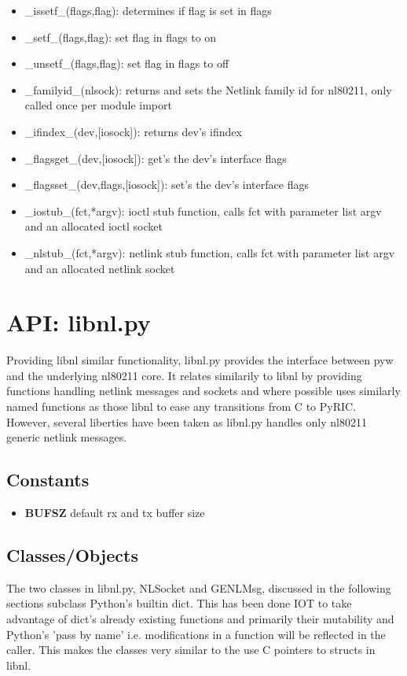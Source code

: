\documentclass[11pt]{article}
\begin{document}
\begin{appendices}
\begin{itemize}
\begin{itemize}
\item \_issetf\_(flags,flag): determines if flag is set in flags
\item \_setf\_(flags,flag): set flag in flags to on
\item \_unsetf\_(flags,flag): set flag in flags to off
\item \_familyid\_(nlsock): returns and sets the Netlink family id for nl80211, 
only called once per module import
\item \_ifindex\_(dev,[iosock]): returns dev's ifindex
\item \_flagsget\_(dev,[iosock]): get's the dev's interface flags
\item \_flagsset\_(dev,flags,[iosock]): set's the dev's interface flags
\item \_iostub\_(fct,*argv): ioctl stub function, calls fct with parameter list argv
and an allocated ioctl socket
\item \_nlstub\_(fct,*argv): netlink stub function, calls fct with parameter list
argv and an allocated netlink socket
\end{itemize}
\end{itemize}

\section{API: libnl.py}\label{sec:libnlapi}
Providing libnl similar functionality, libnl.py provides the interface between
pyw and the underlying nl80211 core. It relates similarily to libnl by providing
functions handling netlink messages and sockets and where possible uses similarly
named functions as those libnl to ease any transitions from C to PyRIC. However,
several liberties have been taken as libnl.py handles only nl80211 generic netlink
messages.

\subsection{Constants}
\begin{itemize}
\item \textbf{BUFSZ} default rx and tx buffer size
\end{itemize}

\subsection{Classes/Objects}
The two classes in libnl.py, NLSocket and GENLMsg, discussed in the following 
sections subclass Python's builtin dict. This has been done IOT to take advantage 
of dict's already existing functions and primarily their mutability and Python's
'pass by name' i.e. modifications in a function will be reflected in the caller.
This makes the classes very similar to the use C pointers to structs in libnl.


\end{appendices}
\end{document}
